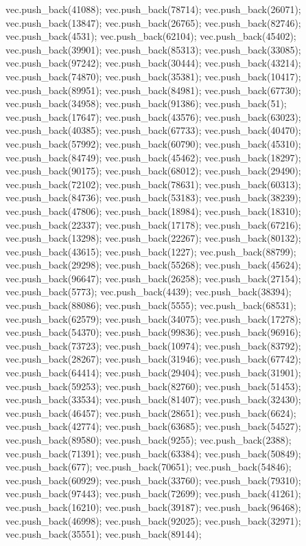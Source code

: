 vec.push_back(41088);
vec.push_back(78714);
vec.push_back(26071);
vec.push_back(13847);
vec.push_back(26765);
vec.push_back(82746);
vec.push_back(4531);
vec.push_back(62104);
vec.push_back(45402);
vec.push_back(39901);
vec.push_back(85313);
vec.push_back(33085);
vec.push_back(97242);
vec.push_back(30444);
vec.push_back(43214);
vec.push_back(74870);
vec.push_back(35381);
vec.push_back(10417);
vec.push_back(89951);
vec.push_back(84981);
vec.push_back(67730);
vec.push_back(34958);
vec.push_back(91386);
vec.push_back(51);
vec.push_back(17647);
vec.push_back(43576);
vec.push_back(63023);
vec.push_back(40385);
vec.push_back(67733);
vec.push_back(40470);
vec.push_back(57992);
vec.push_back(60790);
vec.push_back(45310);
vec.push_back(84749);
vec.push_back(45462);
vec.push_back(18297);
vec.push_back(90175);
vec.push_back(68012);
vec.push_back(29490);
vec.push_back(72102);
vec.push_back(78631);
vec.push_back(60313);
vec.push_back(84736);
vec.push_back(53183);
vec.push_back(38239);
vec.push_back(47806);
vec.push_back(18984);
vec.push_back(18310);
vec.push_back(22337);
vec.push_back(17178);
vec.push_back(67216);
vec.push_back(13298);
vec.push_back(22267);
vec.push_back(80132);
vec.push_back(43615);
vec.push_back(1227);
vec.push_back(88799);
vec.push_back(29298);
vec.push_back(55268);
vec.push_back(45624);
vec.push_back(96647);
vec.push_back(26258);
vec.push_back(27154);
vec.push_back(5773);
vec.push_back(4439);
vec.push_back(38394);
vec.push_back(88086);
vec.push_back(5555);
vec.push_back(68531);
vec.push_back(62579);
vec.push_back(34075);
vec.push_back(17278);
vec.push_back(54370);
vec.push_back(99836);
vec.push_back(96916);
vec.push_back(73723);
vec.push_back(10974);
vec.push_back(83792);
vec.push_back(28267);
vec.push_back(31946);
vec.push_back(67742);
vec.push_back(64414);
vec.push_back(29404);
vec.push_back(31901);
vec.push_back(59253);
vec.push_back(82760);
vec.push_back(51453);
vec.push_back(33534);
vec.push_back(81407);
vec.push_back(32430);
vec.push_back(46457);
vec.push_back(28651);
vec.push_back(6624);
vec.push_back(42774);
vec.push_back(63685);
vec.push_back(54527);
vec.push_back(89580);
vec.push_back(9255);
vec.push_back(2388);
vec.push_back(71391);
vec.push_back(63384);
vec.push_back(50849);
vec.push_back(677);
vec.push_back(70651);
vec.push_back(54846);
vec.push_back(60929);
vec.push_back(33760);
vec.push_back(79310);
vec.push_back(97443);
vec.push_back(72699);
vec.push_back(41261);
vec.push_back(16210);
vec.push_back(39187);
vec.push_back(96468);
vec.push_back(46998);
vec.push_back(92025);
vec.push_back(32971);
vec.push_back(35551);
vec.push_back(89144);
